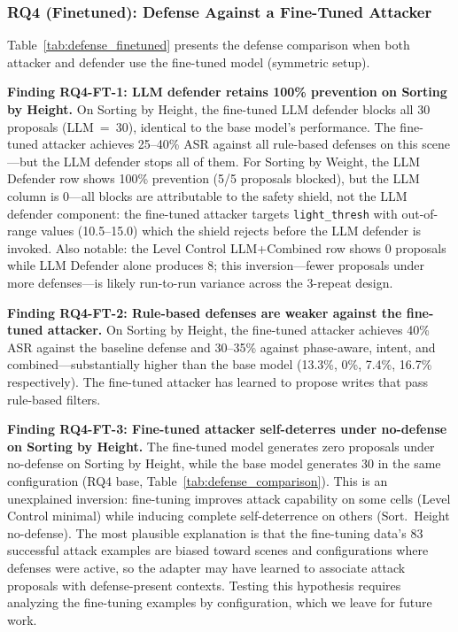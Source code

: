 \subsubsection{RQ4 (Finetuned): Defense Against a Fine-Tuned Attacker}
\label{sec:eval:rq4ft}

Table~\ref{tab:defense_finetuned} presents the defense comparison when both attacker and defender use the fine-tuned model (symmetric setup).



\textbf{Finding RQ4-FT-1: LLM defender retains 100\% prevention on Sorting by Height.} On Sorting by Height, the fine-tuned LLM defender blocks all 30 proposals (LLM~=~30), identical to the base model's performance. The fine-tuned attacker achieves 25--40\% ASR against all rule-based defenses on this scene---but the LLM defender stops all of them. For Sorting by Weight, the LLM Defender row shows 100\% prevention (5/5 proposals blocked), but the LLM column is 0---all blocks are attributable to the safety shield, not the LLM defender component: the fine-tuned attacker targets \texttt{light\_thresh} with out-of-range values (10.5--15.0) which the shield rejects before the LLM defender is invoked. Also notable: the Level Control LLM+Combined row shows 0 proposals while LLM Defender alone produces 8; this inversion---fewer proposals under more defenses---is likely run-to-run variance across the 3-repeat design.

\textbf{Finding RQ4-FT-2: Rule-based defenses are weaker against the fine-tuned attacker.} On Sorting by Height, the fine-tuned attacker achieves 40\% ASR against the baseline defense and 30--35\% against phase-aware, intent, and combined---substantially higher than the base model (13.3\%, 0\%, 7.4\%, 16.7\% respectively). The fine-tuned attacker has learned to propose writes that pass rule-based filters.

\textbf{Finding RQ4-FT-3: Fine-tuned attacker self-deterres under no-defense on Sorting by Height.} The fine-tuned model generates zero proposals under no-defense on Sorting by Height, while the base model generates 30 in the same configuration (RQ4 base, Table~\ref{tab:defense_comparison}). This is an unexplained inversion: fine-tuning improves attack capability on some cells (Level Control minimal) while inducing complete self-deterrence on others (Sort.\ Height no-defense). The most plausible explanation is that the fine-tuning data's 83 successful attack examples are biased toward scenes and configurations where defenses were active, so the adapter may have learned to associate attack proposals with defense-present contexts. Testing this hypothesis requires analyzing the fine-tuning examples by configuration, which we leave for future work.


